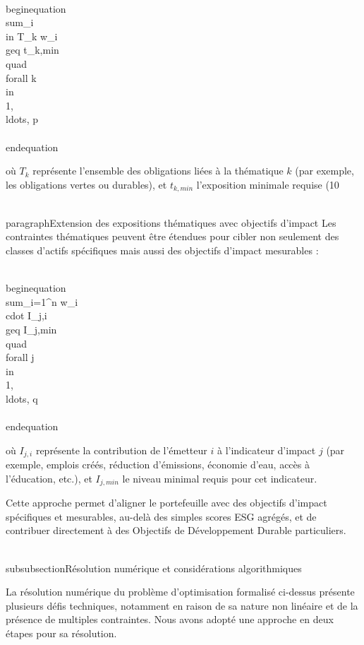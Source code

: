 \\begin{equation}
\\sum_{i \\in T_k} w_i \\geq t_{k,min} \\quad \\forall k \\in \\{1, \\ldots, p\\}
\\end{equation}

où $T_k$ représente l'ensemble des obligations liées à la thématique $k$ (par exemple, les obligations vertes ou durables), et $t_{k,min}$ l'exposition minimale requise (10%

\\paragraph{Extension des expositions thématiques avec objectifs d'impact}
Les contraintes thématiques peuvent être étendues pour cibler non seulement des classes d'actifs spécifiques mais aussi des objectifs d'impact mesurables :

\\begin{equation}
\\sum_{i=1}^{n} w_i \\cdot I_{j,i} \\geq I_{j,min} \\quad \\forall j \\in \\{1, \\ldots, q\\}
\\end{equation}

où $I_{j,i}$ représente la contribution de l'émetteur $i$ à l'indicateur d'impact $j$ (par exemple, emplois créés, réduction d'émissions, économie d'eau, accès à l'éducation, etc.), et $I_{j,min}$ le niveau minimal requis pour cet indicateur.

Cette approche permet d'aligner le portefeuille avec des objectifs d'impact spécifiques et mesurables, au-delà des simples scores ESG agrégés, et de contribuer directement à des Objectifs de Développement Durable particuliers.

\\subsubsection{Résolution numérique et considérations algorithmiques}

La résolution numérique du problème d'optimisation formalisé ci-dessus présente plusieurs défis techniques, notamment en raison de sa nature non linéaire et de la présence de multiples contraintes. Nous avons adopté une approche en deux étapes pour sa résolution.

